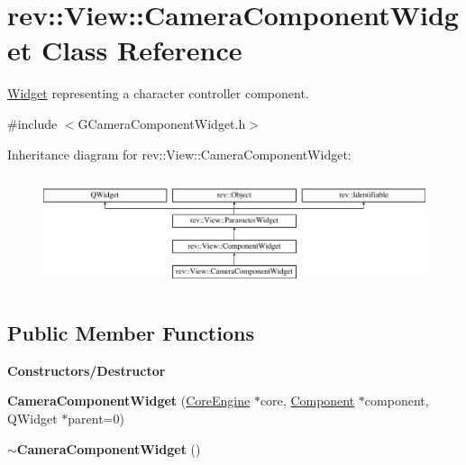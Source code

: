 \hypertarget{classrev_1_1_view_1_1_camera_component_widget}{}\section{rev\+::View\+::Camera\+Component\+Widget Class Reference}
\label{classrev_1_1_view_1_1_camera_component_widget}


\mbox{\hyperlink{class_widget}{Widget}} representing a character controller component.  




{\ttfamily \#include $<$G\+Camera\+Component\+Widget.\+h$>$}

Inheritance diagram for rev\+::View\+::Camera\+Component\+Widget\+:\begin{figure}[H]
\begin{center}
\leavevmode
\includegraphics[height=3.333333cm]{classrev_1_1_view_1_1_camera_component_widget}
\end{center}
\end{figure}
\subsection*{Public Member Functions}
\begin{Indent}\textbf{ Constructors/\+Destructor}\par
\begin{DoxyCompactItemize}
\item 
\mbox{\label{classrev_1_1_view_1_1_camera_component_widget_af21fde38f55631fbbe9193e98876fd91}} 
{\bfseries Camera\+Component\+Widget} (\mbox{\hyperlink{classrev_1_1_core_engine}{Core\+Engine}} $\ast$core, \mbox{\hyperlink{classrev_1_1_component}{Component}} $\ast$component, Q\+Widget $\ast$parent=0)
\item 
\mbox{\label{classrev_1_1_view_1_1_camera_component_widget_a5e9bd11e54043afd6be5b932fcad4fb5}} 
{\bfseries $\sim$\+Camera\+Component\+Widget} ()
\end{DoxyCompactItemize}
\end{Indent}
